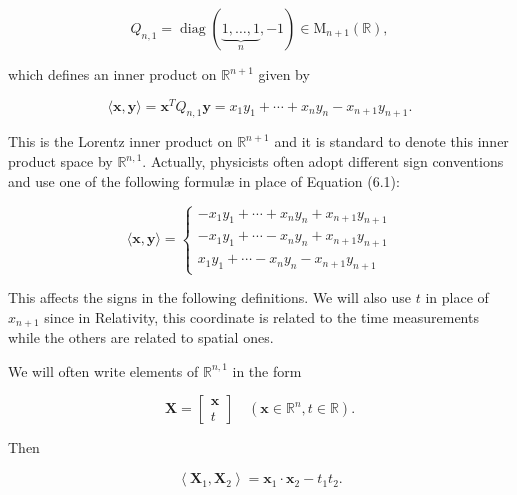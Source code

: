 \documentclass[10pt, letterpaper]{article}
\begin{document}
$$
Q_{n, 1}=\operatorname{diag}(\underbrace{1, \ldots, 1}_{n},-1) \in \mathrm{M}_{n+1}(\mathbb{R}),
$$

which defines an inner product on $\mathbb{R}^{n+1}$ given by

$$
\langle\mathbf{x}, \mathbf{y}\rangle=\mathbf{x}^{T} Q_{n, 1} \mathbf{y}=x_{1} y_{1}+\cdots+x_{n} y_{n}-x_{n+1} y_{n+1} .
$$

This is the Lorentz inner product on $\mathbb{R}^{n+1}$ and it is standard to denote this inner product space by $\mathbb{R}^{n, 1}$. Actually, physicists often adopt different sign conventions and use one of the following formulæ in place of Equation (6.1):

$$
\langle\mathbf{x}, \mathbf{y}\rangle=\left\{\begin{array}{c}
-x_{1} y_{1}+\cdots+x_{n} y_{n}+x_{n+1} y_{n+1} \\
-x_{1} y_{1}+\cdots-x_{n} y_{n}+x_{n+1} y_{n+1} \\
x_{1} y_{1}+\cdots-x_{n} y_{n}-x_{n+1} y_{n+1}
\end{array}\right.
$$

This affects the signs in the following definitions. We will also use $t$ in place of $x_{n+1}$ since in Relativity, this coordinate is related to the time measurements while the others are related to spatial ones.

We will often write elements of $\mathbb{R}^{n, 1}$ in the form

$$
\mathbf{X}=\left[\begin{array}{c}
\mathbf{x} \\
t
\end{array}\right] \quad\left(\mathbf{x} \in \mathbb{R}^{n}, t \in \mathbb{R}\right) .
$$

Then

$$
\left\langle\mathbf{X}_{1}, \mathbf{X}_{2}\right\rangle=\mathbf{x}_{1} \cdot \mathbf{x}_{2}-t_{1} t_{2} .
$$
\end{document}
